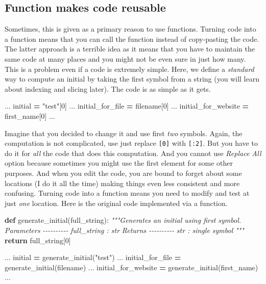 \documentclass[
]{book}
\newenvironment{Shaded}{\begin{snugshade}}{\end{snugshade}}
\newcommand{\CommentTok}[1]{\textcolor[rgb]{0.56,0.35,0.01}{\textit{#1}}}
\newcommand{\ControlFlowTok}[1]{\textcolor[rgb]{0.13,0.29,0.53}{\textbf{#1}}}
\newcommand{\DecValTok}[1]{\textcolor[rgb]{0.00,0.00,0.81}{#1}}
\newcommand{\KeywordTok}[1]{\textcolor[rgb]{0.13,0.29,0.53}{\textbf{#1}}}
\newcommand{\NormalTok}[1]{#1}
\newcommand{\OperatorTok}[1]{\textcolor[rgb]{0.81,0.36,0.00}{\textbf{#1}}}
\newcommand{\StringTok}[1]{\textcolor[rgb]{0.31,0.60,0.02}{#1}}
\begin{document}
\hypertarget{function-makes-code-reusable}{%
\subsection{Function makes code reusable}\label{function-makes-code-reusable}}

Sometimes, this is given as a primary reason to use functions. Turning code into a function means that you can call the function instead of copy-pasting the code. The latter approach is a terrible idea as it means that you have to maintain the same code at many places and you might not be even sure in just how many. This is a problem even if a code is extremely simple. Here, we define a \emph{standard} way to compute an initial by taking the first symbol from a string (you will learn about indexing and slicing later). The code is as simple as it gets.

\begin{Shaded}
\begin{Highlighting}[]
\NormalTok{...}
\NormalTok{initial }\OperatorTok{=} \StringTok{"test"}\NormalTok{[}\DecValTok{0}\NormalTok{]}
\NormalTok{...}
\NormalTok{initial\_for\_file }\OperatorTok{=}\NormalTok{ filename[}\DecValTok{0}\NormalTok{]}
\NormalTok{...}
\NormalTok{initial\_for\_website }\OperatorTok{=}\NormalTok{ first\_name[}\DecValTok{0}\NormalTok{]}
\NormalTok{...}
\end{Highlighting}
\end{Shaded}

Imagine that you decided to change it and use first \emph{two} symbols. Again, the computation is not complicated, use just replace \texttt{{[}0{]}} with \texttt{{[}:2{]}}. But you have to do it for \emph{all} the code that does this computation. And you cannot use \emph{Replace All} option because sometimes you might use the first element for some other purposes. And when you edit the code, you are bound to forget about some locations (I do it all the time) making things even less consistent and more confusing. Turning code into a function means you need to modify and test at just \emph{one} location. Here is the original code implemented via a function.

\begin{Shaded}
\begin{Highlighting}[]
\KeywordTok{def}\NormalTok{ generate\_initial(full\_string):}
    \CommentTok{"""Generates an initial using first symbol.}
\CommentTok{    }
\CommentTok{    Parameters}
\CommentTok{    {-}{-}{-}{-}{-}{-}{-}{-}{-}{-}}
\CommentTok{    full\_string : str}
\CommentTok{    }
\CommentTok{    Returns}
\CommentTok{    {-}{-}{-}{-}{-}{-}{-}{-}{-}{-}}
\CommentTok{    str : single symbol}
\CommentTok{    """}
    \ControlFlowTok{return}\NormalTok{ full\_string[}\DecValTok{0}\NormalTok{]}

\NormalTok{...}
\NormalTok{initial }\OperatorTok{=}\NormalTok{ generate\_initial(}\StringTok{"test"}\NormalTok{)}
\NormalTok{...}
\NormalTok{initial\_for\_file }\OperatorTok{=}\NormalTok{ generate\_initial(filename)}
\NormalTok{...}
\NormalTok{initial\_for\_website }\OperatorTok{=}\NormalTok{ generate\_initial(first\_name)}
\NormalTok{...}
\end{Highlighting}
\end{Shaded}
\end{document}

